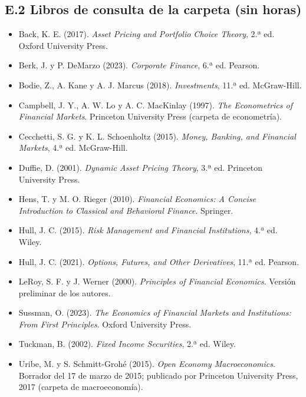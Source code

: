 \documentclass[11pt,a4paper]{article}
\begin{document}
\subsection*{E.2 Libros de consulta de la carpeta (sin horas)}
{\small
\begin{itemize}[leftmargin=1.4em,itemsep=1pt,label={}]
\item Back, K. E. (2017). \emph{Asset Pricing and Portfolio Choice Theory}, 2.ª ed. Oxford University Press.
\item Berk, J. y P. DeMarzo (2023). \emph{Corporate Finance}, 6.ª ed. Pearson.
\item Bodie, Z., A. Kane y A. J. Marcus (2018). \emph{Investments}, 11.ª ed. McGraw-Hill.
\item Campbell, J. Y., A. W. Lo y A. C. MacKinlay (1997). \emph{The Econometrics of Financial Markets}. Princeton University Press (carpeta de econometría).
\item Cecchetti, S. G. y K. L. Schoenholtz (2015). \emph{Money, Banking, and Financial Markets}, 4.ª ed. McGraw-Hill.
\item Duffie, D. (2001). \emph{Dynamic Asset Pricing Theory}, 3.ª ed. Princeton University Press.
\item Hens, T. y M. O. Rieger (2010). \emph{Financial Economics: A Concise Introduction to Classical and Behavioral Finance}. Springer.
\item Hull, J. C. (2015). \emph{Risk Management and Financial Institutions}, 4.ª ed. Wiley.
\item Hull, J. C. (2021). \emph{Options, Futures, and Other Derivatives}, 11.ª ed. Pearson.
\item LeRoy, S. F. y J. Werner (2000). \emph{Principles of Financial Economics}. Versión preliminar de los autores.
\item Sussman, O. (2023). \emph{The Economics of Financial Markets and Institutions: From First Principles}. Oxford University Press.
\item Tuckman, B. (2002). \emph{Fixed Income Securities}, 2.ª ed. Wiley.
\item Uribe, M. y S. Schmitt-Grohé (2015). \emph{Open Economy Macroeconomics}. Borrador del 17 de marzo de 2015; publicado por Princeton University Press, 2017 (carpeta de macroeconomía).
\end{itemize}
}
\end{document}
